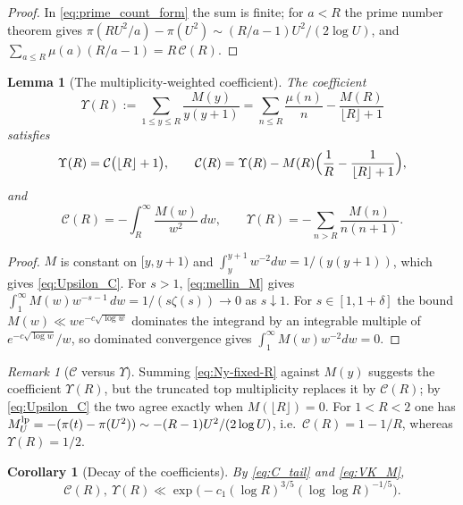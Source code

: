 \documentclass[11pt]{amsart}
\numberwithin{equation}{section}
\theoremstyle{plain}
\newtheorem{lemma}[theorem]{Lemma}
\newtheorem{corollary}[theorem]{Corollary}
\theoremstyle{definition}
\theoremstyle{remark}
\newtheorem{remark}[theorem]{Remark}
\newcommand{\Cc}{\mathcal{C}}
\begin{document}
\begin{proof}
In \eqref{eq:prime_count_form} the sum is finite; for $a<R$ the prime number
theorem gives $\pi(RU^2/a)-\pi(U^2)\sim(R/a-1)U^2/(2\log U)$, and
$\sum_{a\le R}\mu(a)(R/a-1)=R\,\Cc(R)$.
\end{proof}

\begin{lemma}[The multiplicity-weighted coefficient]
\label{lem:copy-weight-coefficient}
The coefficient
\begin{equation}
\label{eq:Upsilon_def}
  \Upsilon(R):=\sum_{1\le y\le R}\frac{M(y)}{y(y+1)}
  =\sum_{n\le R}\frac{\mu(n)}n-\frac{M(R)}{\lfloor R\rfloor+1}
\end{equation}
satisfies
\begin{equation}
\label{eq:Upsilon_C}
  \Upsilon(R)=\Cc\bigl(\lfloor R\rfloor+1\bigr),\qquad
  \Cc(R)=\Upsilon(R)-M(R)\Bigl(\frac1R-\frac1{\lfloor R\rfloor+1}\Bigr),
\end{equation}
and
\begin{equation}
\label{eq:C_tail}
  \Cc(R)=-\int_R^\infty\frac{M(w)}{w^2}\,dw,\qquad
  \Upsilon(R)=-\sum_{n>R}\frac{M(n)}{n(n+1)}.
\end{equation}
\end{lemma}

\begin{proof}
$M$ is constant on $[y,y+1)$ and $\int_y^{y+1}w^{-2}dw=1/(y(y+1))$, which
gives \eqref{eq:Upsilon_C}. For $s>1$, \eqref{eq:mellin_M} gives
$\int_1^\infty M(w)w^{-s-1}\,dw=1/(s\zeta(s))\to0$ as $s\downarrow1$. For
$s\in[1,1+\delta]$ the bound $M(w)\ll we^{-c\sqrt{\log w}}$ dominates the
integrand by an integrable multiple of $e^{-c\sqrt{\log w}}/w$, so dominated
convergence gives $\int_1^\infty M(w)w^{-2}dw=0$.
\end{proof}

\begin{remark}[$\Cc$ versus $\Upsilon$]
\label{rem:C-vs-Upsilon}
Summing \eqref{eq:Ny-fixed-R} against $M(y)$ suggests the coefficient
$\Upsilon(R)$, but the truncated top multiplicity replaces it by $\Cc(R)$; by
\eqref{eq:Upsilon_C} the two agree exactly when $M(\lfloor R\rfloor)=0$. For
$1<R<2$ one has $M^{\rm lp}_U=-(\pi(t)-\pi(U^2))\sim-(R-1)U^2/(2\log U)$, i.e.\
$\Cc(R)=1-1/R$, whereas $\Upsilon(R)=1/2$.
\end{remark}

\begin{corollary}[Decay of the coefficients]
\label{cor:AR-VK}
By \eqref{eq:C_tail} and \eqref{eq:VK_M},
\begin{equation}
\label{eq:AR-VK}
  \Cc(R),\ \Upsilon(R)\ll\exp\bigl(-c_1(\log R)^{3/5}(\log\log R)^{-1/5}\bigr).
\end{equation}
\end{corollary}
\end{document}
